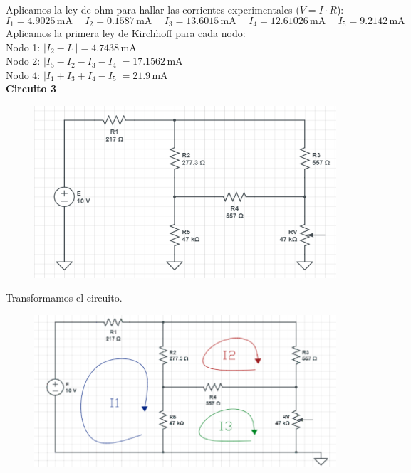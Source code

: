\documentclass[a4paper,12pt]{report}
\begin{document}
\begin{enumerate}
\begin{figure}[H]
\begin{center}
\end{center}
\end{figure}
Aplicamos la ley de ohm para hallar las corrientes experimentales ($V = I \cdot R$):
$$
I_{1} = 4.9025\,\mathrm{mA} \hspace{15pt} I_{2} = 0.1587\,\mathrm{mA} \hspace{15pt} I_{3}=13.6015\,\mathrm{mA} \hspace{15pt} I_{4} = 12.61026\,\mathrm{mA} \hspace{15pt} I_{5} = 9.2142\,\mathrm{mA}
$$
Aplicamos la primera ley de Kirchhoff para cada nodo:\\
Nodo 1: $\vert I_{2} - I_{1} \vert  = 4.7438\,\mathrm{mA}$\\
Nodo 2: $\vert I_{5} - I_{2} - I_{3} - I_{4} \vert  = 17.1562\,\mathrm{mA}$\\
Nodo 4: $\vert I_{1} + I_{3} + I_{4} - I_{5} \vert  = 21.9\,\mathrm{mA}$\\
\textbf{Circuito 3}\\
\begin{figure}[H]
\begin{center}
\includegraphics[scale=0.45]{sergodcirc3,2.png}
\end{center}
\end{figure}
Transformamos el circuito.
\begin{figure}[H]
\begin{center}
\includegraphics[scale=0.45]{sergodcirc3,3.png}

\end{center}
\end{figure}
\end{enumerate}
\end{document}

